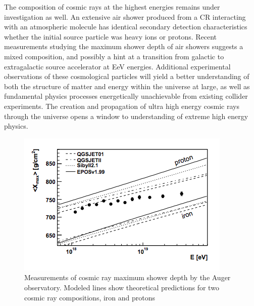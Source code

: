 	The composition of cosmic rays at the highest energies remains under investigation as well.  An extensive air shower produced from a CR interacting with an atmospheric molecule has identical secondary detection characteristics whether the initial source particle was heavy ions or protons.  Recent measurements studying the maximum shower depth of air showers suggests a mixed composition, and possibly a hint at a transition from galactic to extragalactic source accelerator at EeV energies.\cite{AugerXmax}\cite{AugerXmaxDiscussion} Additional experimental observations of these cosmological particles will yield a better understanding of both the structure of matter and energy within the universe at large, as well as fundamental physics processes energetically unachievable from existing collider experiments.  The creation and propagation of ultra high energy cosmic rays through the universe opens a window to understanding of extreme high energy physics.

		
\noindent
\begin{figure}
\centering
	\includegraphics[width=\textwidth]{figures/AugerXmax}
	\caption{Measurements of cosmic ray maximum shower depth by the Auger observatory.  Modeled lines show theoretical predictions for two cosmic ray compositions, iron and protons\cite{AugerXmax}}
	\label{fig:AugerXmax}
\end{figure}


